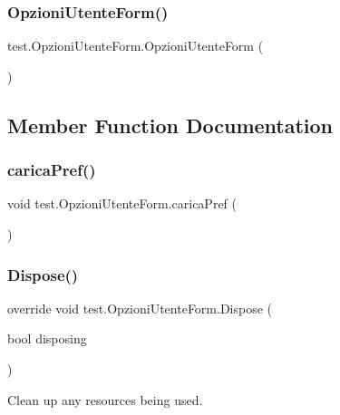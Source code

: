 \subsubsection{\texorpdfstring{Opzioni\+Utente\+Form()}{OpzioniUtenteForm()}}
{\footnotesize\ttfamily test.\+Opzioni\+Utente\+Form.\+Opzioni\+Utente\+Form (\begin{DoxyParamCaption}{ }\end{DoxyParamCaption})}



\subsection{Member Function Documentation}
\mbox{\label{classtest_1_1_opzioni_utente_form_ad614275f0bf1d9751dff844ba4c35555}} 
\subsubsection{\texorpdfstring{carica\+Pref()}{caricaPref()}}
{\footnotesize\ttfamily void test.\+Opzioni\+Utente\+Form.\+carica\+Pref (\begin{DoxyParamCaption}{ }\end{DoxyParamCaption})}

\mbox{\label{classtest_1_1_opzioni_utente_form_a5aa05f4074cdf20ca0d991c2ff96d06c}} 
\subsubsection{\texorpdfstring{Dispose()}{Dispose()}}
{\footnotesize\ttfamily override void test.\+Opzioni\+Utente\+Form.\+Dispose (\begin{DoxyParamCaption}\item[{bool}]{disposing }\end{DoxyParamCaption})\hspace{0.3cm}{\ttfamily [protected]}}



Clean up any resources being used. 


